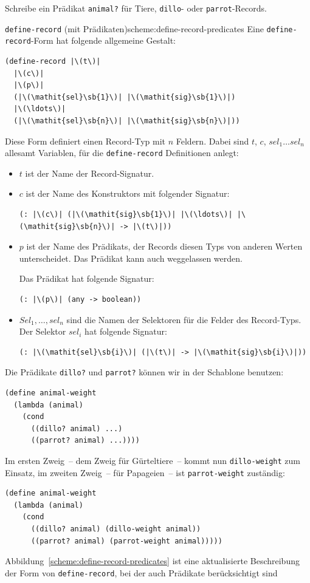\begin{aufgabeinline}
  Schreibe ein Prädikat \lstinline{animal?} für Tiere,
  \lstinline{dillo}- oder
  \lstinline{parrot}-Records.
\end{aufgabeinline}
%
\begin{feature}{\texttt{define-record} (mit Prädikaten)}{scheme:define-record-predicates}
Eine \lstinline{define-record}-Form
hat folgende allgemeine Gestalt:
%
\begin{lstlisting}
(define-record |\(t\)|
  |\(c\)|
  |\(p\)|
  (|\(\mathit{sel}\sb{1}\)| |\(\mathit{sig}\sb{1}\)|)
  |\(\ldots\)|
  (|\(\mathit{sel}\sb{n}\)| |\(\mathit{sig}\sb{n}\)|))
\end{lstlisting}
%
Diese Form definiert einen Record-Typ mit $n$ Feldern.
Dabei sind $t$, $c$, $\mathit{sel}_1 \ldots \mathit{sel}_n$ allesamt Variablen, für die
\lstinline{define-record} Definitionen anlegt:
%
\begin{itemize}
\item $t$ ist der Name der Record-Signatur.
\item $c$ ist der Name des Konstruktors mit 
  folgender Signatur:
%  
\begin{lstlisting}
(: |\(c\)| (|\(\mathit{sig}\sb{1}\)| |\(\ldots\)| |\(\mathit{sig}\sb{n}\)| -> |\(t\)|))
\end{lstlisting}
\item $p$ ist der Name des Prädikats, der Records diesen Typs von
  anderen Werten unterscheidet.  Das Prädikat kann auch weggelassen
  werden.

    Das Prädikat hat folgende Signatur:
\begin{lstlisting}
(: |\(p\)| (any -> boolean))
\end{lstlisting}
\item $\mathit{Sel}_1, \ldots, \mathit{sel}_n$ sind die Namen der Selektoren für die Felder
  des Record-Typs.  Der Selektor $\mathit{sel}_i$ hat folgende Signatur:
% 
\begin{lstlisting}
(: |\(\mathit{sel}\sb{i}\)| (|\(t\)| -> |\(\mathit{sig}\sb{i}\)|))
\end{lstlisting}
\end{itemize}
%
\end{feature}
%
Die Prädikate \lstinline{dillo?}  und \lstinline{parrot?}  können wir
in der Schablone benutzen:
%
\begin{lstlisting}
(define animal-weight
  (lambda (animal)
    (cond
      ((dillo? animal) ...)
      ((parrot? animal) ...))))
\end{lstlisting}
%
Im ersten Zweig~-- dem Zweig für Gürteltiere~-- kommt nun
\lstinline{dillo-weight} zum Einsatz, im zweiten Zweig~-- für
Papageien~-- ist \lstinline{parrot-weight} zuständig:
%
\begin{lstlisting}
(define animal-weight
  (lambda (animal)
    (cond
      ((dillo? animal) (dillo-weight animal))
      ((parrot? animal) (parrot-weight animal)))))
\end{lstlisting}
% 
Abbildung~\ref{scheme:define-record-predicates} ist eine
aktualisierte Beschreibung der Form von
\lstinline{define-record}, bei der auch Prädikate
berücksichtigt sind

